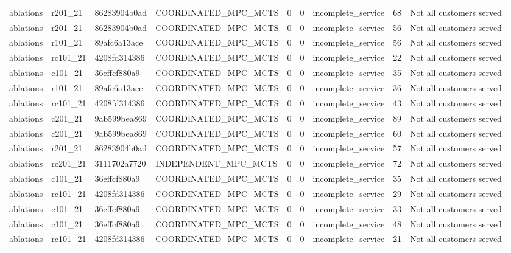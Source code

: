 \begin{table}
{\begin{tabular}{llllrrlrl}
ablations & r201\_21 & 86283904b0ad & COORDINATED\_MPC\_MCTS & 0 & 0 & incomplete\_service & 68 & Not all customers served \\
ablations & r201\_21 & 86283904b0ad & COORDINATED\_MPC\_MCTS & 0 & 0 & incomplete\_service & 56 & Not all customers served \\
ablations & r101\_21 & 89afc6a13ace & COORDINATED\_MPC\_MCTS & 0 & 0 & incomplete\_service & 56 & Not all customers served \\
ablations & rc101\_21 & 4208fd314386 & COORDINATED\_MPC\_MCTS & 0 & 0 & incomplete\_service & 22 & Not all customers served \\
ablations & c101\_21 & 36effcf880a9 & COORDINATED\_MPC\_MCTS & 0 & 0 & incomplete\_service & 35 & Not all customers served \\
ablations & r101\_21 & 89afc6a13ace & COORDINATED\_MPC\_MCTS & 0 & 0 & incomplete\_service & 36 & Not all customers served \\
ablations & rc101\_21 & 4208fd314386 & COORDINATED\_MPC\_MCTS & 0 & 0 & incomplete\_service & 43 & Not all customers served \\
ablations & c201\_21 & 9ab599bea869 & COORDINATED\_MPC\_MCTS & 0 & 0 & incomplete\_service & 89 & Not all customers served \\
ablations & c201\_21 & 9ab599bea869 & COORDINATED\_MPC\_MCTS & 0 & 0 & incomplete\_service & 60 & Not all customers served \\
ablations & r201\_21 & 86283904b0ad & COORDINATED\_MPC\_MCTS & 0 & 0 & incomplete\_service & 57 & Not all customers served \\
ablations & rc201\_21 & 3111702a7720 & INDEPENDENT\_MPC\_MCTS & 0 & 0 & incomplete\_service & 72 & Not all customers served \\
ablations & c101\_21 & 36effcf880a9 & COORDINATED\_MPC\_MCTS & 0 & 0 & incomplete\_service & 35 & Not all customers served \\
ablations & rc101\_21 & 4208fd314386 & COORDINATED\_MPC\_MCTS & 0 & 0 & incomplete\_service & 29 & Not all customers served \\
ablations & c101\_21 & 36effcf880a9 & COORDINATED\_MPC\_MCTS & 0 & 0 & incomplete\_service & 33 & Not all customers served \\
ablations & c101\_21 & 36effcf880a9 & COORDINATED\_MPC\_MCTS & 0 & 0 & incomplete\_service & 48 & Not all customers served \\
ablations & rc101\_21 & 4208fd314386 & COORDINATED\_MPC\_MCTS & 0 & 0 & incomplete\_service & 21 & Not all customers served \\

\end{tabular}}
\end{table}
